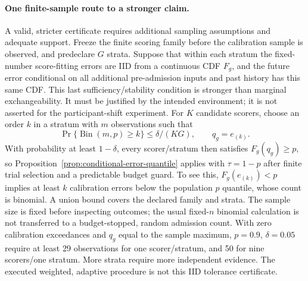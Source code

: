 \paragraph{One finite-sample route to a stronger claim.}
A valid, stricter certificate requires additional sampling assumptions
and adequate support. Freeze the finite scoring family before the
calibration sample is observed, and predeclare $G$ strata. Suppose that
within each stratum the fixed-number score-fitting errors are IID from a
continuous CDF $F_g$, and the future error conditional on all additional
pre-admission inputs and past history has this same CDF. This last
sufficiency/stability condition is stronger than marginal exchangeability.
It must be justified by the intended environment; it is not asserted for
the participant-shift experiment. For $K$ candidate scorers, choose an
order $k$ in a stratum with $m$ observations such that
\begin{equation}
 \Pr\{\operatorname{Bin}(m,p)\geq k\}
 \leq\delta/(KG),\qquad q_g=e_{(k)}.
 \label{eq:conditional-tolerance-order}
\end{equation}
With probability at least $1-\delta$, every scorer/stratum then satisfies
$F_g(q_g)\geq p$, so Proposition~\ref{prop:conditional-error-quantile}
applies with $\tau=1-p$ after finite trial selection and a predictable
budget guard. To see this, $F_g(e_{(k)})<p$ implies at least $k$
calibration errors below the population $p$ quantile, whose count is
binomial. A union bound covers the declared family and strata.
The sample size is fixed before inspecting outcomes; the usual fixed-$n$
binomial calculation is not transferred to a budget-stopped, random
admission count. With zero calibration exceedances and $q_g$ equal to
the sample maximum, $p=0.9$, $\delta=0.05$ require at least 29 observations
for one scorer/stratum, and 50 for nine scorers/one stratum. More strata
require more independent evidence. The executed weighted, adaptive
procedure is not this IID tolerance certificate.

